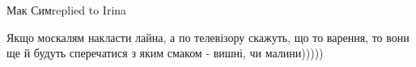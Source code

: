  
 
 
 
 

Мак Симreplied to Irina

Якщо москалям накласти лайна, а по телевізору скажуть, що то варення, то вони
ще й будуть сперечатися з яким смаком - вишні, чи малини)))))
